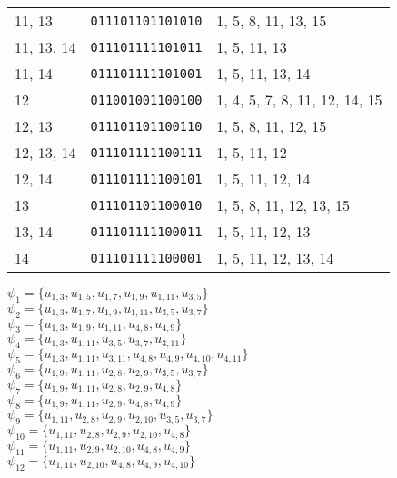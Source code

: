 \documentclass[a4paper,12pt]{article}
\begin{document}
\begin{longtable}{l|l|l}
        11, 13&\texttt{011101101101010}&1, 5, 8, 11, 13, 15\\
        11, 13, 14&\texttt{011101111101011}&1, 5, 11, 13\\
        11, 14&\texttt{011101111101001}&1, 5, 11, 13, 14\\
        12&\texttt{011001001100100}&1, 4, 5, 7, 8, 11, 12, 14, 15\\
        12, 13&\texttt{011101101100110}&1, 5, 8, 11, 12, 15\\
        12, 13, 14&\texttt{011101111100111}&1, 5, 11, 12\\
        12, 14&\texttt{011101111100101}&1, 5, 11, 12, 14\\
        13&\texttt{011101101100010}&1, 5, 8, 11, 12, 13, 15\\
        13, 14&\texttt{011101111100011}&1, 5, 11, 12, 13\\
        14&\texttt{011101111100001}&1, 5, 11, 12, 13, 14\\
    \end{longtable}

    \noindent
    $\psi_{1}=\{u_{1,3},u_{1,5},u_{1,7},u_{1,9},u_{1,11},u_{3,5}\}$\\
    $\psi_{2}=\{u_{1,3},u_{1,7},u_{1,9},u_{1,11},u_{3,5},u_{3,7}\}$\\
    $\psi_{3}=\{u_{1,3},u_{1,9},u_{1,11},u_{4,8},u_{4,9}\}$\\
    $\psi_{4}=\{u_{1,3},u_{1,11},u_{3,5},u_{3,7},u_{3,11}\}$\\
    $\psi_{5}=\{u_{1,3},u_{1,11},u_{3,11},u_{4,8},u_{4,9},u_{4,10},u_{4,11}\}$\\
    $\psi_{6}=\{u_{1,9},u_{1,11},u_{2,8},u_{2,9},u_{3,5},u_{3,7}\}$\\
    $\psi_{7}=\{u_{1,9},u_{1,11},u_{2,8},u_{2,9},u_{4,8}\}$\\
    $\psi_{8}=\{u_{1,9},u_{1,11},u_{2,9},u_{4,8},u_{4,9}\}$\\
    $\psi_{9}=\{u_{1,11},u_{2,8},u_{2,9},u_{2,10},u_{3,5},u_{3,7}\}$\\
    $\psi_{10}=\{u_{1,11},u_{2,8},u_{2,9},u_{2,10},u_{4,8}\}$\\
    $\psi_{11}=\{u_{1,11},u_{2,9},u_{2,10},u_{4,8},u_{4,9}\}$\\
    $\psi_{12}=\{u_{1,11},u_{2,10},u_{4,8},u_{4,9},u_{4,10}\}$\\
\end{document}

